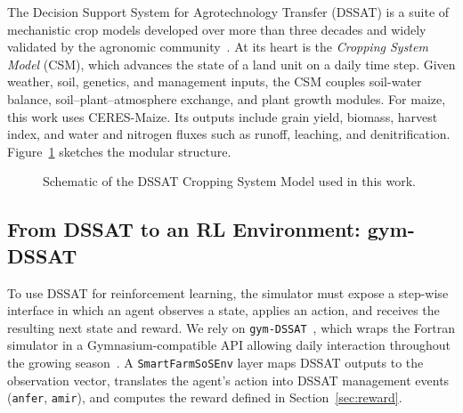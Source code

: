 The Decision Support System for Agrotechnology Transfer (DSSAT) is a suite of
mechanistic crop models developed over more than three decades and widely
validated by the agronomic community~\cite{jones2003dssat,hoogenboom2019}. At
its heart is the \emph{Cropping System Model} (CSM), which advances the state of
a land unit on a daily time step. Given weather, soil, genetics, and management
inputs, the CSM couples soil-water balance, soil--plant--atmosphere exchange,
and plant growth modules. For maize, this work uses CERES-Maize. Its outputs
include grain yield, biomass, harvest index, and water and nitrogen fluxes such
as runoff, leaching, and denitrification. Figure~\ref{fig:dssat} sketches the
modular structure.


\begin{figure}[ht]
\centering
{}
\caption{Schematic of the DSSAT Cropping System Model used in this work.}
\label{fig:dssat}
\end{figure}


\subsection{From DSSAT to an RL Environment: gym-DSSAT}

To use DSSAT for reinforcement learning, the simulator must expose a step-wise
interface in which an agent observes a state, applies an action, and receives
the resulting next state and reward. We rely on \texttt{gym-DSSAT}~\cite{gautron2022gymdssat},
which wraps the Fortran simulator in a Gymnasium-compatible API allowing daily
interaction throughout the growing season~\cite{gautron2022review}. A
\texttt{SmartFarmSoSEnv} layer maps DSSAT outputs to the observation vector,
translates the agent's action into DSSAT management events
(\texttt{anfer}, \texttt{amir}), and computes the reward defined in
Section~\ref{sec:reward}.


